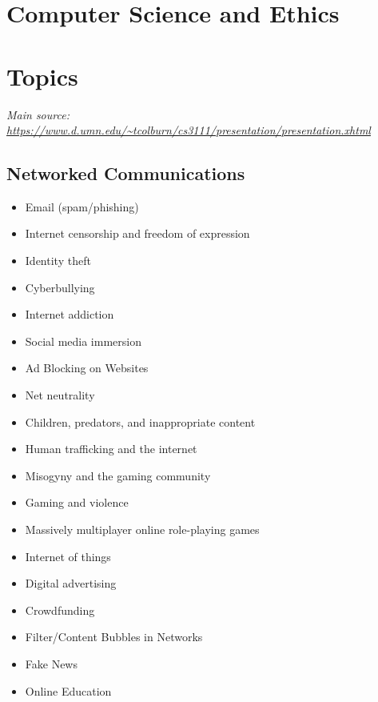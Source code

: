 \documentclass[12pt,a4paper]{report}
\begin{document}
\section*{Computer Science and Ethics}

\section*{Topics}
\emph{Main source: \url{https://www.d.umn.edu/~tcolburn/cs3111/presentation/presentation.xhtml}}
\subsection*{Networked Communications}
\begin{itemize}
\item Email (spam/phishing)
\item Internet censorship and freedom of expression
\item Identity theft
\item Cyberbullying
\item Internet addiction
\item Social media immersion
\item Ad Blocking on Websites
\item Net neutrality
\item Children, predators, and inappropriate content
\item Human trafficking and the internet
\item Misogyny and the gaming community
\item Gaming and violence
\item Massively multiplayer online role-playing games
\item Internet of things
\item Digital advertising
\item Crowdfunding
\item Filter/Content Bubbles in Networks
\item Fake News
\item Online Education
\end{itemize}
\end{document}
